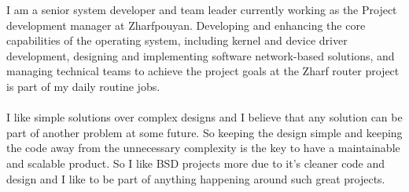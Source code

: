 \documentclass[12pt]{developercv}
\begin{document}
\begin{minipage}[t]{1\textwidth}
I am a senior system developer and team leader currently working
as the Project development manager at Zharfpouyan.
Developing and enhancing the core capabilities of the operating system,
including kernel and device driver development,
designing and implementing software network-based solutions, and managing
technical teams to achieve the project goals at the Zharf router project is
part of my daily routine jobs.
\\
\\
I like simple solutions over complex designs and I believe that any solution
can be part of another problem at some future. So keeping the design simple and
keeping the code away from the unnecessary complexity is the key to have a
maintainable and scalable product. So I like BSD projects more due to it's cleaner
code and design and I like to be part of anything happening around such great projects.

\end{minipage}
\hfill %
%
\end{document}
